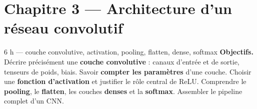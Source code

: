 \section{Chapitre 3 --- Architecture d'un réseau convolutif}

%
{6 h --- couche convolutive, activation, pooling, flatten, dense, softmax}%
{\textbf{Objectifs.} Décrire précisément une \textbf{couche convolutive} : canaux
d'entrée et de sortie, tenseurs de poids, biais. Savoir \textbf{compter les paramètres}
d'une couche. Choisir une \textbf{fonction d'activation} et justifier le rôle central de
ReLU. Comprendre le \textbf{pooling}, le \textbf{flatten}, les couches \textbf{denses}
et la \textbf{softmax}. Assembler le pipeline complet d'un CNN.}

